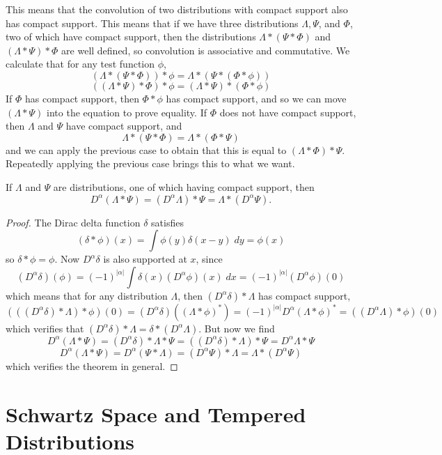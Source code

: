 This means that the convolution of two distributions with compact support also has compact support. This means that if we have three distributions $\Lambda, \Psi$, and $\Phi$, two of which have compact support, then the distributions $\Lambda * (\Psi * \Phi)$ and $(\Lambda * \Psi) * \Phi$ are well defined, so convolution is associative and commutative. We calculate that for any test function $\phi$,
%
\[ (\Lambda * (\Psi * \Phi)) * \phi = \Lambda * (\Psi * (\Phi * \phi)) \]
\[ ((\Lambda * \Psi) * \Phi) * \phi = (\Lambda * \Psi) * (\Phi * \phi) \]
%
If $\Phi$ has compact support, then $\Phi * \phi$ has compact support, and so we can move $(\Lambda * \Psi)$ into the equation to prove equality. If $\Phi$ does not have compact support, then $\Lambda$ and $\Psi$ have compact support, and
%
\[ \Lambda * (\Psi * \Phi) = \Lambda * (\Phi * \Psi) \]
%
and we can apply the previous case to obtain that this is equal to $(\Lambda * \Phi) * \Psi$. Repeatedly applying the previous case brings this to what we want.

\begin{theorem}
    If $\Lambda$ and $\Psi$ are distributions, one of which having compact support, then
    \[ D^\alpha(\Lambda * \Psi) = (D^\alpha \Lambda) * \Psi = \Lambda * (D^\alpha \Psi). \]
\end{theorem}
\begin{proof}
    The Dirac delta function $\delta$ satisfies
    \[ (\delta * \phi)(x) = \int \phi(y) \delta(x-y)\; dy = \phi(x) \]
    so $\delta * \phi = \phi$. Now $D^\alpha \delta$ is also supported at $x$, since
    \[ (D^\alpha \delta)(\phi) = (-1)^{|\alpha|} \int \delta(x) (D^\alpha \phi)(x)\; dx = (-1)^{|\alpha|} (D^\alpha \phi)(0) \]
    which means that for any distribution $\Lambda$, then $(D^\alpha \delta) * \Lambda$ has compact support,
    \[ (((D^\alpha \delta) * \Lambda) * \phi)(0) = (D^\alpha \delta)((\Lambda * \phi)^*) = (-1)^{|\alpha|} D^\alpha (\Lambda * \phi)^* = ((D^\alpha \Lambda) * \phi)(0) \]
    which verifies that $(D^\alpha \delta) * \Lambda = \delta * (D^\alpha \Lambda)$. But now we find
    \[ D^\alpha(\Lambda * \Psi) = (D^\alpha \delta) * \Lambda * \Psi = ((D^\alpha \delta) * \Lambda) * \Psi = D^\alpha \Lambda * \Psi \]
    \[ D^\alpha(\Lambda * \Psi) = D^\alpha(\Psi * \Lambda) = (D^\alpha \Psi) * \Lambda = \Lambda * (D^\alpha \Psi) \]
    which verifies the theorem in general.
\end{proof}

\section{Schwartz Space and Tempered Distributions}

